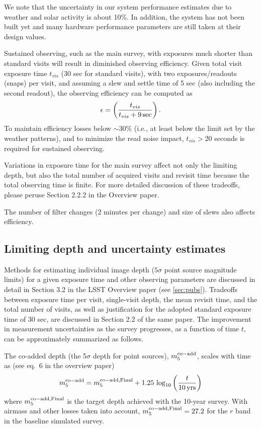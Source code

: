 \documentclass[DM,lsstdraft,toc,usenatbib]{lsstdoc}
\begin{document}
We note that the uncertainty in our system performance estimates due to weather and solar activity is about 10\%.
In addition, the system has not been built yet and many hardware performance parameters are
still taken at their design values.  

Sustained observing, such as the main survey, with exposures much shorter than standard visits will result
in diminished observing efficiency. Given total visit exposure time $t_{vis}$ (30 sec for standard
visits), with two exposures/readouts (snaps) per visit, and assuming a slew and settle time of 5 sec 
(also including the second readout), the observing efficiency can be computed as 
\begin{equation}
     \epsilon = \left( {t_{vis} \over t_{vis} + 9 \, \mathrm{sec}}\right).
\end{equation}
To maintain efficiency losses below $\sim$30\% (i.e., at least below the limit set by the weather patterns),
and to minimize the read noise impact, $t_{vis} > 20$ seconds is required for sustained observing. 

Variations in exposure time for the main survey affect not only the limiting depth, but also the total number of 
acquired visits and revisit time because the total observing time is finite. For more detailed 
discussion of these tradeoffs, please peruse Section 2.2.2 in the Overview paper. 

The number of filter changes (2 minutes per change) and size of slews also affects efficiency. 


\subsection{Limiting depth and uncertainty estimates}  

Methods for estimating individual image depth ($5\sigma$ point source magnitude limits) for a given 
exposure time and other observing parameters
are discussed in detail in Section 3.2 in the LSST Overview paper (see \ref{sec:pubs}). Tradeoffs between 
exposure time per visit, single-visit depth, the mean revisit time, and the total number of visits,
as well as justification for the adopted standard exposure time of 30 sec, are discussed in Section 
2.2 of the same paper. The improvement in measurement uncertainties as the survey progresses,
as a function of time $t$, can be approximately summarized as follows. 

The co-added depth (the 5$\sigma$ depth for point sources), $m_5^{\rm co-add}$, scales 
with time as (see eq.~6 in the overview paper)  
\begin{equation} 
         m_5^{\rm co-add}  = m_5^{\rm co-add, Final}  + 1.25 \, \log_{10}\left({t \over 10 \, {\rm yrs}}\right) 
\end{equation} 
where $m_5^{\rm co-add, Final}$ is the target depth achieved with the 10-year survey. With
airmass and other losses taken into account, $m_5^{\rm co-add, Final}=27.2$ for the $r$ band
in the baseline simulated survey. 
\end{document}
